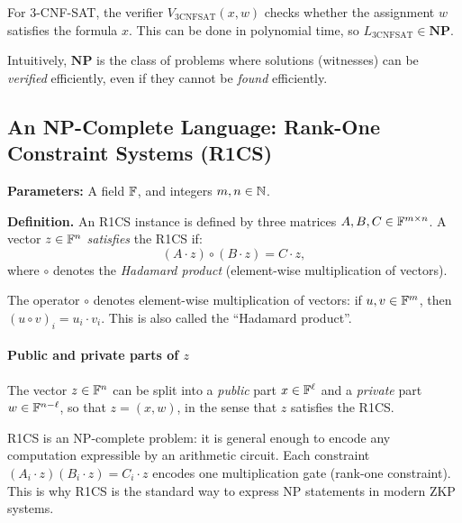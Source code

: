 \documentclass[11pt]{article}
\begin{document}
\begin{example}
For 3-CNF-SAT, the verifier $V_{\mathrm{3CNFSAT}}(x, w)$ checks whether the assignment $w$
satisfies the formula $x$.  This can be done in polynomial time, so
$L_{\mathrm{3CNFSAT}} \in \mathbf{NP}$.
\end{example}

\begin{remark}
Intuitively, $\mathbf{NP}$ is the class of problems where solutions (witnesses) can be
\emph{verified} efficiently, even if they cannot be \emph{found} efficiently.
\end{remark}

\subsection{An NP-Complete Language: Rank-One Constraint Systems (R1CS)}

\begin{tcolorbox}[colback=purple!5!white, colframe=purple!60!black,
  title=Rank-One Constraint Systems (R1CS)]
\textbf{Parameters:} A field $\mathbb{F}$, and integers $m, n \in \mathbb{N}$.

\medskip
\textbf{Definition.}
An R1CS instance is defined by three matrices $A, B, C \in \mathbb{F}^{m \times n}$.
A vector $z \in \mathbb{F}^n$ \emph{satisfies} the R1CS if:
\[
  (A \cdot z) \circ (B \cdot z) = C \cdot z,
\]
where $\circ$ denotes the \emph{Hadamard product} (element-wise multiplication of vectors).
\end{tcolorbox}

\begin{remark}
The operator $\circ$ denotes element-wise multiplication of vectors: if $u, v \in \mathbb{F}^m$,
then $(u \circ v)_i = u_i \cdot v_i$.  This is also called the ``Hadamard product''.
\end{remark}

\paragraph{Public and private parts of $z$}
The vector $z \in \mathbb{F}^n$ can be split into a \emph{public} part $x \in \mathbb{F}^\ell$
and a \emph{private} part $w \in \mathbb{F}^{n-\ell}$, so that $z = (x, w)$, in the sense
that $z$ satisfies the R1CS.

\begin{remark}
R1CS is an NP-complete problem: it is general enough to encode any computation expressible
by an arithmetic circuit.
Each constraint $(A_i \cdot z)(B_i \cdot z) = C_i \cdot z$ encodes one multiplication gate
(rank-one constraint).
This is why R1CS is the standard way to express NP statements in modern ZKP systems.
\end{remark}
\end{document}
